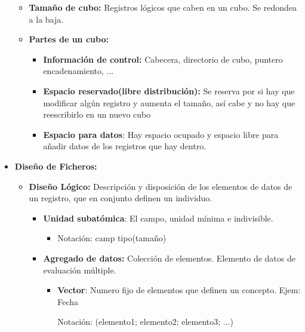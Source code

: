 \documentclass[12pt, twoside, openright]{report} %
\begin{document}
\begin{itemize}
\begin{itemize}
    \item \textbf{Tamaño de cubo:} Registros lógicos que caben en un cubo.
      Se redondea a la baja.
      \pagebreak
    \item \textbf{Partes de un cubo:}
      

      \begin{itemize}
      \item \textbf{Información de control:} Cabecera, directorio de cubo,
        puntero encadenamiento, ...
        
      \item \textbf{Espacio reservado(libre distribución):} Se reserva por
        si hay que modificar algún registro y aumenta el tamaño, así
        cabe y no hay que reescribirlo en un nuevo cubo
        
      \item \textbf{Espacio para datos}: Hay espacio ocupado y espacio libre
        para añadir datos de los registros que hay dentro.
        
      \end{itemize}
    \end{itemize}
  \item \textbf{Diseño de Ficheros:}
    

    \begin{itemize}
    \item \textbf{Diseño Lógico:} Descripción y disposición de los elementos
      de datos de un registro, que en conjunto definen un individuo.
      

      \begin{itemize}
      \item \textbf{Unidad subatómica}: El campo, unidad mínima e
        indivisible.
        

        \begin{itemize}
        \item Notación: camp tipo(tamaño)
          
        \end{itemize}
      \item \textbf{Agregado de datos:} Colección de elementos. Elemento de
        datos de evaluación múltiple.
        

        \begin{itemize}
        \item \textbf{Vector}: Numero fijo de elementos que definen un
          concepto. Ejem: Fecha
          

            Notación: (elemento1; elemento2; elemento3; ...)
        

\end{itemize}
\end{itemize}
\end{itemize}
\end{itemize}
\end{document}

